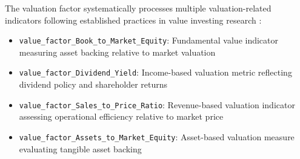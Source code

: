 \documentclass[3p,times,procedia]{elsarticle}
\begin{document}
The valuation factor systematically processes multiple valuation-related indicators following established practices in value investing research \cite{Graham2003}:

\begin{itemize}
    \item \texttt{value\_factor\_Book\_to\_Market\_Equity}: Fundamental value indicator measuring asset backing relative to market valuation
    \item \texttt{value\_factor\_Dividend\_Yield}: Income-based valuation metric reflecting dividend policy and shareholder returns
    \item \texttt{value\_factor\_Sales\_to\_Price\_Ratio}: Revenue-based valuation indicator assessing operational efficiency relative to market price
    \item \texttt{value\_factor\_Assets\_to\_Market\_Equity}: Asset-based valuation measure evaluating tangible asset backing
\end{itemize}
\end{document}
